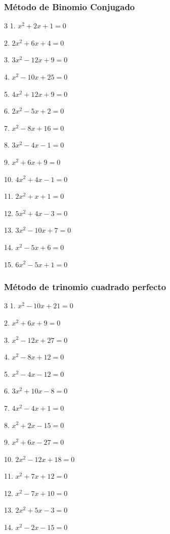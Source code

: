 \documentclass[12pt]{article}
\theoremstyle{plain}
\theoremstyle{definition}
\theoremstyle{remark}
\begin{document}
{\subsubsection*{Método de Binomio Conjugado}
\begin{multicols}{3}
1. $x^2 + 2x + 1 = 0$

2. $2x^2 + 6x + 4 = 0$

3. $3x^2 - 12x + 9 = 0$

4. $x^2 - 10x + 25 = 0$

5. $4x^2 + 12x + 9 = 0$

6. $2x^2 - 5x + 2 = 0$

7. $x^2 - 8x + 16 = 0$

8. $3x^2 - 4x - 1 = 0$

9. $x^2 + 6x + 9 = 0$

10. $4x^2 + 4x - 1 = 0$

11. $2x^2 + x + 1 = 0$

12. $5x^2 + 4x - 3 = 0$

13. $3x^2 - 10x + 7 = 0$

14. $x^2 - 5x + 6 = 0$

15. $6x^2 - 5x + 1 = 0$
\end{multicols}
\subsubsection*{Método de trinomio cuadrado perfecto}

\begin{multicols}{3}
1. $x^2 - 10x + 21 = 0$

2. $x^2 + 6x + 9 = 0$

3. $x^2 - 12x + 27 = 0$

4. $x^2 - 8x + 12 = 0$

5. $x^2 - 4x - 12 = 0$

6. $3x^2 + 10x - 8 = 0$

7. $4x^2 - 4x + 1 = 0$

8. $x^2 + 2x - 15 = 0$

9. $x^2 + 6x - 27 = 0$

10. $2x^2 - 12x + 18 = 0$

11. $x^2 + 7x + 12 = 0$

12. $x^2 - 7x + 10 = 0$

13. $2x^2 + 5x - 3 = 0$

14. $x^2 - 2x - 15 = 0$


\end{multicols}}
\end{document}
